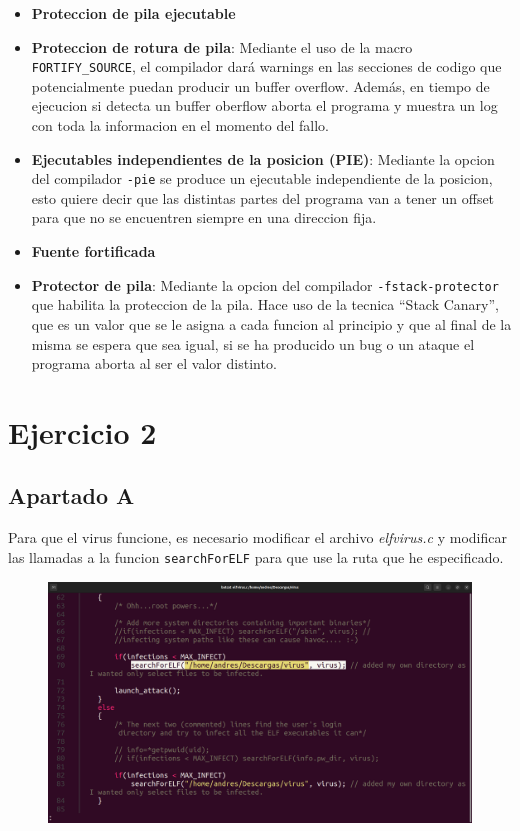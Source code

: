\documentclass{article}
\begin{document}
\begin{itemize}
    \item \textbf{Proteccion de pila ejecutable}
    \item \textbf{Proteccion de rotura de pila}: Mediante el uso de la macro \verb|FORTIFY_SOURCE|, el compilador dará warnings en las secciones de codigo que potencialmente puedan producir un buffer overflow. Además, en tiempo de ejecucion si detecta un buffer oberflow aborta el programa y muestra un log con toda la informacion en el momento del fallo.
    \item \textbf{Ejecutables independientes de la posicion (PIE)}: Mediante la opcion del compilador \verb|-pie| se produce un ejecutable independiente de la posicion, esto quiere decir que las distintas partes del programa van a tener un offset para que no se encuentren siempre en una direccion fija.
    \item \textbf{Fuente fortificada}
    \item \textbf{Protector de pila}: Mediante la opcion del compilador \verb|-fstack-protector| que habilita la proteccion de la pila. Hace uso de la tecnica ``Stack Canary'', que es un valor que se le asigna a cada funcion al principio y que al final de la misma se espera que sea igual, si se ha producido un bug o un ataque el programa aborta al ser el valor distinto.
\end{itemize}

\section*{Ejercicio 2}

\subsection*{Apartado A}

Para que el virus funcione, es necesario modificar el archivo \textit{elfvirus.c} y modificar las llamadas a la funcion \verb|searchForELF| para que use la ruta que he especificado.

\begin{figure}[H]
    \includegraphics[width=\textwidth]{imagenes/Captura desde 2022-11-25 17-29-47.png}
\end{figure}
\end{document}
